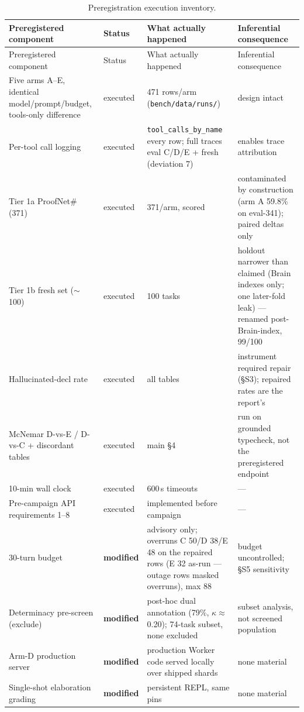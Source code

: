 \documentclass[10pt]{article}
\newcommand{\code}[1]{\texttt{#1}}
\begin{document}
\begingroup\footnotesize
\begin{longtable}{@{}p{}p{}p{}p{}@{}}
\caption{Preregistration execution inventory.}
\label{tab:inventory}\\
\toprule
Preregistered component & Status & What actually happened & Inferential consequence \\
\midrule
\endfirsthead
\toprule
Preregistered component & Status & What actually happened & Inferential consequence \\
\midrule
\endhead
Five arms A--E, identical model/prompt/budget, tools-only difference & executed & 471 rows/arm (\code{bench/data/runs/}) & design intact \\
Per-tool call logging & executed & \code{tool\_calls\_by\_name} every row; full traces eval C/D/E + fresh (deviation 7) & enables trace attribution \\
Tier 1a ProofNet\# (371) & executed & 371/arm, scored & contaminated by construction (arm A 59.8\% on eval-341); paired deltas only \\
Tier 1b fresh set ($\sim$100) & executed & 100 tasks & holdout narrower than claimed (Brain indexes only; one later-fold leak) --- renamed post-Brain-index, 99/100 \\
Hallucinated-decl rate & executed & all tables & instrument required repair (\S S3); repaired rates are the report's \\
McNemar D-vs-E / D-vs-C + discordant tables & executed & main \S 4 & run on grounded typecheck, not the preregistered endpoint \\
10-min wall clock & executed & 600\,s timeouts & --- \\
Pre-campaign API requirements 1--8 & executed & implemented before campaign & --- \\
30-turn budget & \textbf{modified} & advisory only; overruns C 50/D 38/E 48 on the repaired rows (E 32 as-run --- outage rows masked overruns), max 88 & budget uncontrolled; \S S5 sensitivity \\
Determinacy pre-screen (exclude) & \textbf{modified} & post-hoc dual annotation (79\%, $\kappa\approx$0.20); 74-task subset, none excluded & subset analysis, not screened population \\
Arm-D production server & \textbf{modified} & production Worker code served locally over shipped shards & none material \\
Single-shot elaboration grading & \textbf{modified} & persistent REPL, same pins & none material \\

\end{longtable}
\end{document}

